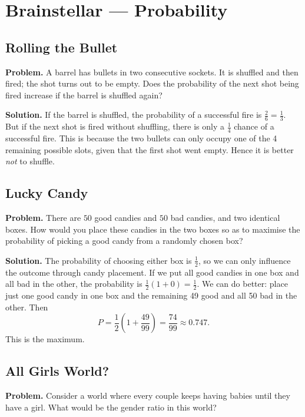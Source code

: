 
\section{Brainstellar --- Probability}

\subsection{Rolling the Bullet}

\textbf{Problem.} A barrel has bullets in two consecutive sockets. It is shuffled and then fired; the shot turns out to be empty. Does the probability of the next shot being fired increase if the barrel is shuffled again?

\textbf{Solution.} If the barrel is shuffled, the probability of a successful fire is $\frac{2}{6} = \frac{1}{3}$. But if the next shot is fired without shuffling, there is only a $\frac{1}{4}$ chance of a successful fire. This is because the two bullets can only occupy one of the 4 remaining possible slots, given that the first shot went empty. Hence it is better \emph{not} to shuffle.

\subsection{Lucky Candy}

\textbf{Problem.} There are $50$ good candies and $50$ bad candies, and two identical boxes. How would you place these candies in the two boxes so as to maximise the probability of picking a good candy from a randomly chosen box?

\textbf{Solution.} The probability of choosing either box is $\frac{1}{2}$, so we can only influence the outcome through candy placement. If we put all good candies in one box and all bad in the other, the probability is $\frac{1}{2}(1 + 0) = \frac{1}{2}$. We can do better: place just one good candy in one box and the remaining 49 good and all 50 bad in the other. Then
\[
  P = \frac{1}{2}\!\left(1 + \frac{49}{99}\right) = \frac{74}{99} \approx 0.747.
\]
This is the maximum.

\subsection{All Girls World?}

\textbf{Problem.} Consider a world where every couple keeps having babies until they have a girl. What would be the gender ratio in this world?

